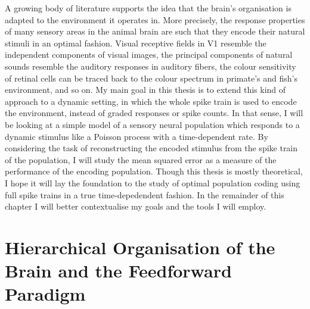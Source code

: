 A growing body of literature supports the idea that the brain's organisation is adapted to the environment it operates in. More precisely, the response properties of many sensory areas
in the animal brain are such that they encode their natural stimuli in an optimal fashion. Visual receptive fields in V1 resemble the independent components of visual images, the principal components of natural sounds resemble the auditory responses in auditory fibers, the colour sensitivity of retinal
cells can be traced back to the colour spectrum in primate's and fish's environment, and so on. My main goal in this thesis is to extend this kind of approach to a 
dynamic setting, in which the whole spike train is used to encode the environment, instead of graded responses or spike counts. In that sense, I will be looking at a simple model
of a sensory neural population which responds to a dynamic stimulus like a Poisson process with a time-dependent rate. By considering the task of reconstructing the encoded
stimulus from the spike train of the population, I will study the mean squared error as a measure of the performance of the encoding population. Though this thesis is mostly
theoretical, I hope it will lay the foundation to the study of optimal population coding using full spike trains in a true time-depedendent fashion. In the remainder of this chapter I will
better contextualise my goals and the tools I will employ.\par

\section{Hierarchical Organisation of the Brain and the Feedforward Paradigm}

